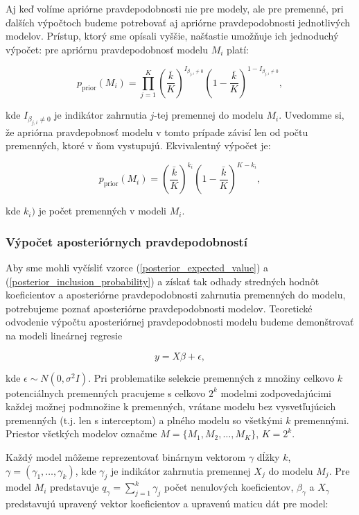 Aj keď volíme apriórne pravdepodobnosti nie pre modely, ale pre premenné,
pri ďalších výpočtoch budeme potrebovať aj apriórne pravdepodobnosti jednotlivých modelov.
Prístup, ktorý sme opísali vyššie, našťastie umožňuje ich jednoduchý výpočet: pre apriórnu pravdepodobnosť modelu \(M_i\) platí:

\[
p_{\text{prior}}(M_i) = \prod_{j = 1}^K \left( \frac{\bar{k}}{K} \right)^{I_{\beta_{j, i} \neq 0}} \left( 1 - \frac{\bar{k}}{K} \right)^{1 - I_{\beta_{j, i} \neq 0}},
\]

kde \( I_{\beta_{j, i} \neq 0} \) je indikátor zahrnutia \(j\)-tej premennej do modelu \(M_i\).
Uvedomme si, že apriórna pravdepobnosť modelu v tomto prípade závisí len od počtu premenných, ktoré v ňom vystupujú.
Ekvivalentný výpočet je:

\[
p_{\text{prior}}(M_i) = \left( \frac{\bar{k}}{K} \right)^{k_i} \left( 1 - \frac{\bar{k}}{K} \right)^{K - k_i},
\]

kde \( k_i) \) je počet premenných v modeli \( M_i \).

\subsubsection{Výpočet aposteriórnych pravdepodobností}

Aby sme mohli vyčísliť vzorce (\ref{posterior_expected_value}) a (\ref{posterior_inclusion_probability}) a získať tak odhady stredných hodnôt koeficientov a aposteriórne pravdepodobnosti zahrnutia premenných do modelu,
potrebujeme poznať aposteriórne pravdepodobnosti modelov.
Teoretické odvodenie výpočtu aposteriórnej pravdepodobnosti modelu budeme demonštrovať na modeli lineárnej regresie

\begin{equation} \label{linear_regression}
y = X \beta + \epsilon,
\end{equation}

kde \( \epsilon \sim N(0, \sigma^2 I) \).
Pri problematike selekcie premenných z množiny celkovo \(k\) potenciálnych premenných pracujeme s celkovo \(2^k\) modelmi zodpovedajúcimi každej možnej podmnožine k premenných,
vrátane modelu bez vysvetľujúcich premenných (t.j. len s interceptom) a plného modelu so všetkými \(k\) premennými.
Priestor všetkých modelov označme \(M = \{ M_1, M_2, \ldots, M_K \} \), \(K = 2^k\).

Každý model môžeme reprezentovať binárnym vektorom \(\gamma\) dĺžky \(k\), \( \gamma = (\gamma_1, \ldots, \gamma_k) \), kde \( \gamma_j \) je indikátor zahrnutia premennej \(X_j\) do modelu \(M_j\).
Pre model \(M_i\) predstavuje \( q_{\gamma} = \sum_{j=1}^k \gamma_j \) počet nenulových koeficientov, \(\beta_{\gamma} \) a \( X_{\gamma} \) predstavujú upravený vektor koeficientov a upravenú maticu dát pre model:


